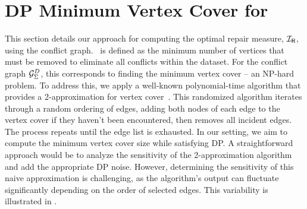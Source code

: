 \section{DP Minimum Vertex Cover for \repair\ }\label{sec:vertex_cover}


This section details our approach for computing the optimal repair measure, $\mathcal{I_\mathsf{R}}$, using the conflict graph. \repair\ is defined as the minimum number of vertices that must be removed to eliminate all conflicts within the dataset. For the conflict graph ${\mathcal{G}_{{\Sigma}}^{D}}$, this corresponds to finding the minimum vertex cover -- an NP-hard problem. To address this, we apply a well-known polynomial-time algorithm that provides a 2-approximation for vertex cover~\cite{vazirani1997approximation}. This randomized algorithm iterates through a random ordering of edges, adding both nodes of each edge to the vertex cover if they haven't been encountered, then removes all incident edges. The process repeats until the edge list is exhausted. 
In our setting, we aim to compute the minimum vertex cover size while satisfying DP. A straightforward approach would be to analyze the sensitivity of the 2-approximation algorithm and add the appropriate DP noise. However, determining the sensitivity of this naive approximation is challenging, as the algorithm's output can fluctuate significantly depending on the order of selected edges. This variability is illustrated in .


